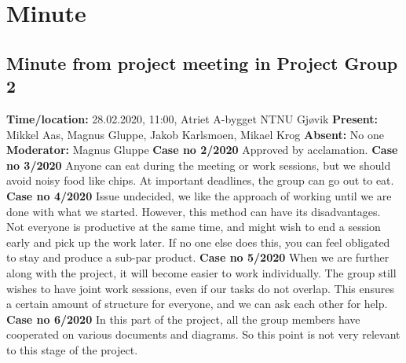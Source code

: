 \documentclass{article}
\begin{document}


\newpage
\section{Minute}
\subsection{Minute from project meeting in Project Group 2}
\newline
\textbf{Time/location:} 28.02.2020, 11:00, Atriet A-bygget NTNU Gjøvik
\newline
\textbf{Present: }Mikkel Aas, Magnus Gluppe, Jakob Karlsmoen, Mikael Krog
\newline
\textbf{Absent:} No one
\newline
\textbf{Moderator:} Magnus Gluppe
 \newline \newline
\textbf{Case no 2/2020} \newline
Approved by acclamation.  \newline  \newline
\textbf{Case no 3/2020}  \newline
Anyone can eat during the meeting or work sessions, but we should avoid noisy food like chips. At important deadlines, the group can go out to eat. \newline  \newline
\textbf{Case no 4/2020}  \newline
Issue undecided, we like the approach of working until we are done with what we started. However, this method can have its disadvantages. Not everyone is productive at the same time, and might wish to end a session early and pick up the work later. If no one else does this, you can feel obligated to stay and produce a sub-par product.  \newline  \newline
\textbf{Case no 5/2020}  \newline
When we are further along with the project, it will become easier to work individually. The group still wishes to have joint work sessions, even if our tasks do not overlap. This ensures a certain amount of structure for everyone, and we can ask each other for help.  \newline  \newline
\textbf{Case no 6/2020}  \newline
In this part of the project, all the group members have cooperated on various documents and diagrams. So this point is not very relevant to this stage of the project. 
\end{document}
